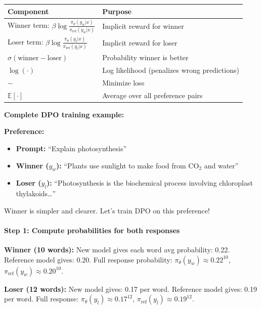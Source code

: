 \begin{chapterenv}
\begin{infobox}
\begin{center}
\begin{tabular}{p{}p{}}
\toprule
\textbf{Component} & \textbf{Purpose} \\
\midrule
Winner term: $\beta \log \frac{\pi_\theta(y_w|x)}{\pi_{\text{ref}}(y_w|x)}$ & Implicit reward for winner \\
Loser term: $\beta \log \frac{\pi_\theta(y_l|x)}{\pi_{\text{ref}}(y_l|x)}$ & Implicit reward for loser \\
$\sigma(\text{winner} - \text{loser})$ & Probability winner is better \\
$\log(\cdot)$ & Log likelihood (penalizes wrong predictions) \\
$-$ & Minimize loss \\
$\mathbb{E}[\cdot]$ & Average over all preference pairs \\
\bottomrule
\end{tabular}
\end{center}
\end{infobox}

\textbf{Complete DPO training example:}

\textbf{Preference:}
\begin{itemize}[nosep]
    \item \textbf{Prompt:} ``Explain photosynthesis''
    \item \textbf{Winner ($y_w$):} ``Plants use sunlight to make food from CO$_2$ and water''
    \item \textbf{Loser ($y_l$):} ``Photosynthesis is the biochemical process involving chloroplast thylakoids\ldots''
\end{itemize}

Winner is simpler and clearer. Let's train DPO on this preference!

\paragraph{Step 1: Compute probabilities for both responses}

\textbf{Winner (10 words):} New model gives each word avg probability: 0.22. Reference model gives: 0.20. Full response probability: $\pi_\theta(y_w) \approx 0.22^{10}$, $\pi_{\text{ref}}(y_w) \approx 0.20^{10}$.

\textbf{Loser (12 words):} New model gives: 0.17 per word. Reference model gives: 0.19 per word. Full response: $\pi_\theta(y_l) \approx 0.17^{12}$, $\pi_{\text{ref}}(y_l) \approx 0.19^{12}$.


\end{chapterenv}
